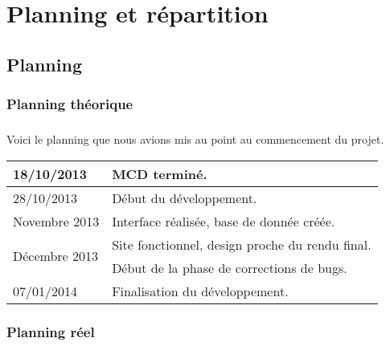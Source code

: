 \chapter{Planning et répartition}

\section{Planning}
    \subsection{Planning théorique}
        \paragraph{}
            Voici le planning que nous avions mis au point au commencement du 
            projet.
        \begin{center}
            \begin{tabular}{|l|l|}
                \hline
                18/10/2013 & MCD terminé. \\
                \hline
                28/10/2013 & Début du développement. \\
                \hline
                Novembre 2013 & Interface réalisée, base de donnée créée. \\
                \hline
                \multirow{2}{*}{Décembre 2013}
                    & Site fonctionnel, design proche du rendu final. \\
                    & Début de la phase de corrections de bugs. \\
                \hline
                07/01/2014 & Finalisation du développement. \\
                \hline
            \end{tabular}
        \end{center}
    \subsection{Planning réel}
